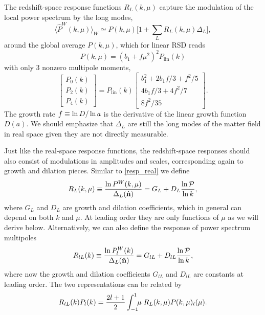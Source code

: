 \documentclass[a4paper,11pt]{article}
\let\d\relax
\DeclareMathOperator{\d}{d}
\let\L\relax
\DeclareMathOperator{\L}{\mathcal{L}}
\newcommand{\los}{{\hat{\mathbf{n}}}}
\newcommand{\Plin}{P_\lin}
\newcommand{\Pdimless}{\mathcal{P}}
\newcommand{\D}{\frac{\d\ln\Pdimless}{\d\ln k}}
\newcommand{\lin}{\mathrm{lin}}
\begin{document}
The redshift-space response functions $R_L(k,\mu)$ capture the modulation of the local power
spectrum by the long modes,
\begin{equation}
    \label{localP_mu}
    \langle\hat P^W(k,\mu)\rangle_W \simeq P(k,\mu)
    \bigl[1+{\textstyle\sum_L}R_L(k,\mu)\Delta_L\bigr],
\end{equation}
around the global average $P(k,\mu)$, which for linear RSD reads
\begin{equation}
    P(k,\mu) = (b_1+f\mu^2)^2 \Plin(k)
\end{equation}
with only 3 nonzero multipole moments,
\begin{equation}
    \label{Kaiser}
    \begin{bmatrix}
        P_0(k) \\ P_2(k) \\ P_4(k)
    \end{bmatrix} = \Plin(k)
    \begin{bmatrix}
        b_1^2 + 2b_1f/3 + f^2/5 \\ 4b_1f/3 + 4f^2/7 \\ 8f^2/35
    \end{bmatrix}.
\end{equation}
The growth rate $f\equiv\d\ln D/\d\ln a$ is the derivative of the linear growth
function $D(a)$.
We should emphasize that $\Delta_L$ are still the long modes of the matter field in
real space given they are not directly measurable.

Just like the real-space response functions, the redshift-space responses
should also consist of modulations in amplitudes and scales, corresponding again to
 growth and dilation pieces.
Similar to \eqref{resp_real} we define
\begin{equation}
    \label{Rmu}
    R_L(k,\mu) \equiv \frac{\d\ln P^W(k,\mu)}{\d\Delta_L(\los)}
    = G_L + D_L \D,
\end{equation}
where $G_L$ and $D_L$ are growth and dilation coefficients,
which in general can depend on both $k$ and $\mu$.
At leading order they are only functions of $\mu$ as we will derive below.
Alternatively, we can also define the response of power spectrum multipoles
\begin{equation}
    \label{Rl}
    R_{lL}(k) \equiv \frac{\d\ln P^W_l(k)}{\d\Delta_L(\los)}
    = G_{lL} + D_{lL} \D,
\end{equation}
where now the growth and dilation coefficients $G_{lL}$ and $D_{lL}$ are
constants at leading order.
The two representations can be related by
\begin{equation}
    \label{R_trans}
    R_{lL}(k) P_l(k) = \frac{2l+1}{2} \int_{-1}^1\!\!\d\mu\;
    R_L(k,\mu) P(k,\mu) \L_l(\mu).
\end{equation}
\end{document}
